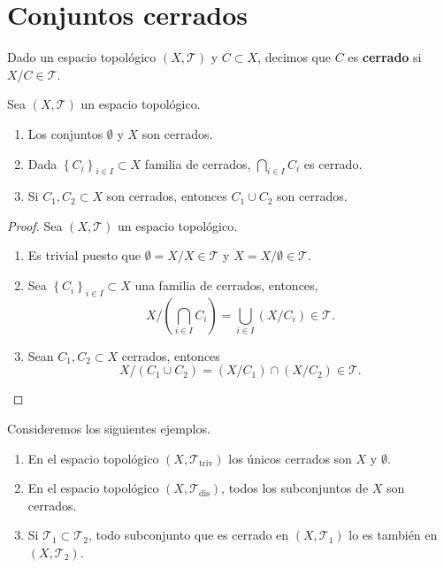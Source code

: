 \section{Conjuntos cerrados}
\begin{definition}
Dado un espacio topológico $\displaystyle \left(X, \mathcal{T}\right) $ y $\displaystyle C \subset X $, decimos que $\displaystyle C $ es \textbf{cerrado} si $\displaystyle X/C \in \mathcal{T} $.
\end{definition}
\begin{prop}
Sea $\displaystyle \left(X, \mathcal{T}\right) $ un espacio topológico.
\begin{enumerate}
\item Los conjuntos $\displaystyle \emptyset $ y $\displaystyle X $ son cerrados.
\item Dada $\displaystyle \left\{ C_{i}\right\} _{i \in I}\subset X $ familia de cerrados, $\displaystyle \bigcap_{i \in I}C_{i} $ es cerrado.
\item Si $\displaystyle C_{1}, C_{2} \subset X $ son cerrados, entonces $\displaystyle C_{1} \cup C_{2} $ son cerrados.
\end{enumerate}
\end{prop}
\begin{proof}
Sea $\displaystyle \left(X, \mathcal{T}\right) $ un espacio topológico. 
\begin{enumerate}
\item Es trivial puesto que $\displaystyle \emptyset = X / X\in \mathcal{T} $ y $\displaystyle X = X / \emptyset \in \mathcal{T}$. 
\item Sea $\displaystyle \left\{ C_{i}\right\} _{i \in I}\subset X $ una familia de cerrados, entonces, 
	\[X / \left(\bigcap_{ i \in I}C_{i}\right)=\bigcup_{i \in I}\left(X/C_{i}\right)\in \mathcal{T} .\]
\item Sean $\displaystyle C_{1}, C_{2} \subset X $ cerrados, entonces
	\[X / \left(C_{1} \cup C_{2}\right)=\left(X / C_{1}\right) \cap \left(X / C_{2}\right) \in \mathcal{T} .\]
\end{enumerate}
\end{proof}
\begin{eg}
Consideremos los siguientes ejemplos.
\begin{enumerate}
\item En el espacio topológico $\displaystyle \left(X, \mathcal{T}_{\text{triv}}\right) $ los únicos cerrados son $\displaystyle X $ y $\displaystyle \emptyset $. 
\item En el espacio topológico $\displaystyle \left(X, \mathcal{T}_{\text{dis}}\right) $, todos los subconjuntos de $\displaystyle X $ son cerrados.
\item Si $\displaystyle \mathcal{T}_{1}\subset \mathcal{T}_{2} $, todo subconjunto que es cerrado en $\displaystyle \left(X, \mathcal{T}_{1}\right) $ lo es también en $\displaystyle \left(X, \mathcal{T}_{2}\right) $. 
\end{enumerate}
\end{eg}

